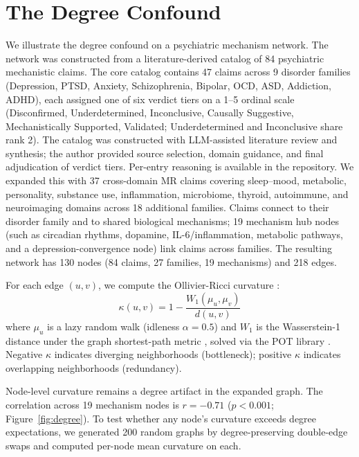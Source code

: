 \documentclass[11pt]{article}
\begin{document}
\section{The Degree Confound}
\label{sec:degree}

We illustrate the degree confound on a psychiatric mechanism network. The network was constructed from a literature-derived catalog of 84 psychiatric mechanistic claims. The core catalog contains 47 claims across 9 disorder families (Depression, PTSD, Anxiety, Schizophrenia, Bipolar, OCD, ASD, Addiction, ADHD), each assigned one of six verdict tiers on a 1--5 ordinal scale (Disconfirmed, Underdetermined, Inconclusive, Causally Suggestive, Mechanistically Supported, Validated; Underdetermined and Inconclusive share rank 2). The catalog was constructed with LLM-assisted literature review and synthesis; the author provided source selection, domain guidance, and final adjudication of verdict tiers. Per-entry reasoning is available in the repository. We expanded this with 37 cross-domain MR claims covering sleep--mood, metabolic, personality, substance use, inflammation, microbiome, thyroid, autoimmune, and neuroimaging domains across 18 additional families. Claims connect to their disorder family and to shared biological mechanisms; 19 mechanism hub nodes (such as circadian rhythms, dopamine, IL-6/inflammation, metabolic pathways, and a depression-convergence node) link claims across families. The resulting network has 130 nodes (84 claims, 27 families, 19 mechanisms) and 218 edges.

For each edge $(u, v)$, we compute the Ollivier-Ricci curvature \citep{ollivier2007ricci, ollivier2009ricci}:
\begin{equation}
\kappa(u, v) = 1 - \frac{W_1(\mu_u, \mu_v)}{d(u, v)}
\end{equation}
where $\mu_u$ is a lazy random walk (idleness $\alpha = 0.5$) and $W_1$ is the Wasserstein-1 distance under the graph shortest-path metric \citep{villani2009optimal}, solved via the POT library \citep{flamary2021pot}. Negative $\kappa$ indicates diverging neighborhoods (bottleneck); positive $\kappa$ indicates overlapping neighborhoods (redundancy).

Node-level curvature remains a degree artifact in the expanded graph. The correlation across 19 mechanism nodes is $r = -0.71$ ($p < 0.001$; Figure~\ref{fig:degree}). To test whether any node's curvature exceeds degree expectations, we generated 200 random graphs by degree-preserving double-edge swaps \citep{maslov2002specificity} and computed per-node mean curvature on each.
\end{document}
